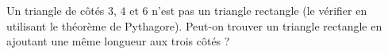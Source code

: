 
\begin{exercice}\label{exoPremiere-0044}

    Un triangle de côtés \( 3\), \( 4\) et \( 6\) n'est pas un triangle rectangle (le vérifier en utilisant le théorème de Pythagore). Peut-on trouver un triangle rectangle en ajoutant une même longueur aux trois côtés ?

\end{exercice}
